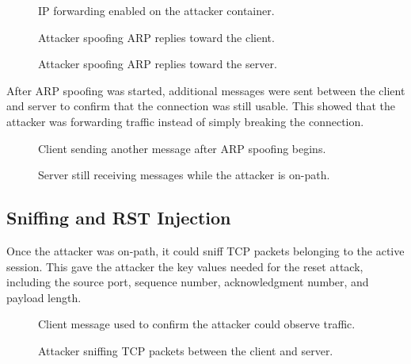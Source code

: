 \begin{figure}[!t]
\centering
{}
\caption{IP forwarding enabled on the attacker container.}
\label{fig:rst_forwarding}
\end{figure}

\begin{figure}[!t]
\centering
{}
\caption{Attacker spoofing ARP replies toward the client.}
\label{fig:rst_arpa}
\end{figure}

\begin{figure}[!t]
\centering
{}
\caption{Attacker spoofing ARP replies toward the server.}
\label{fig:rst_arpb}
\end{figure}

After ARP spoofing was started, additional messages were sent between the client and server to confirm that the connection was still usable. This showed that the attacker was forwarding traffic instead of simply breaking the connection.

\begin{figure}[!t]
\centering
{}
\caption{Client sending another message after ARP spoofing begins.}
\label{fig:rst_message3}
\end{figure}

\begin{figure}[!t]
\centering
{}
\caption{Server still receiving messages while the attacker is on-path.}
\label{fig:rst_message4}
\end{figure}

\subsection{Sniffing and RST Injection}

Once the attacker was on-path, it could sniff TCP packets belonging to the active session. This gave the attacker the key values needed for the reset attack, including the source port, sequence number, acknowledgment number, and payload length.

\begin{figure}[!t]
\centering
{}
\caption{Client message used to confirm the attacker could observe traffic.}
\label{fig:rst_message5}
\end{figure}

\begin{figure}[!t]
\centering
{}
\caption{Attacker sniffing TCP packets between the client and server.}
\label{fig:rst_sniff}
\end{figure}


